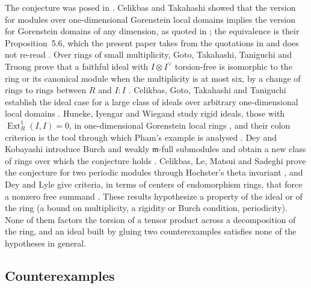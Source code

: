 \documentclass[11pt]{article}
\theoremstyle{definition}
\theoremstyle{remark}
\begin{document}
The conjecture was posed in \cite{HunekeWiegand1994}. Celikbas and Takahashi showed that the version for
modules over one-dimensional Gorenstein local domains implies the version for Gorenstein domains of any
dimension, as quoted in \cite{GarciaSanchezLeamer2013}; the equivalence is their Proposition~5.6, which the
present paper takes from the quotations in \cite{Leamer2012} and does not re-read \cite{CelikbasTakahashi2011}. Over rings of small
multiplicity, Goto, Takahashi, Taniguchi and Truong prove that a faithful ideal with
$I\otimes I^{\vee}$ torsion-free is isomorphic to the ring or its canonical module when the multiplicity is at
most six, by a change of rings to rings between $R$ and $I:I$ \cite{GotoTakahashiTaniguchiTruong2013}.
Celikbas, Goto, Takahashi and Taniguchi establish the ideal case for a large class of ideals over arbitrary
one-dimensional local domains \cite{CelikbasGotoTakahashiTaniguchi2017}. Huneke, Iyengar and Wiegand study rigid
ideals, those with $\operatorname{Ext}^1_R(I,I)=0$, in one-dimensional Gorenstein local rings
\cite{HunekeIyengarWiegand2018}, and their colon criterion is the tool through which Pham's example is analysed
\cite{Pham2026}. Dey and Kobayashi introduce Burch and weakly $\mathfrak m$-full submodules and obtain a new class
of rings over which the conjecture holds \cite{DeyKobayashi2022}. Celikbas, Le, Matsui and Sadeghi prove the
conjecture for two periodic modules through Hochster's theta invariant \cite{CelikbasLeMatsuiSadeghi2022}, and Dey
and Lyle give criteria, in terms of centers of endomorphism rings, that force a nonzero free summand
\cite{DeyLyle2025}. These results hypothesize a property of the ideal or of the ring (a bound on multiplicity, a
rigidity or Burch condition, periodicity). None of them factors the torsion of a tensor product across a
decomposition of the ring, and an ideal built by gluing two counterexamples satisfies none of the hypotheses in
general.

\subsection{Counterexamples}
\end{document}
